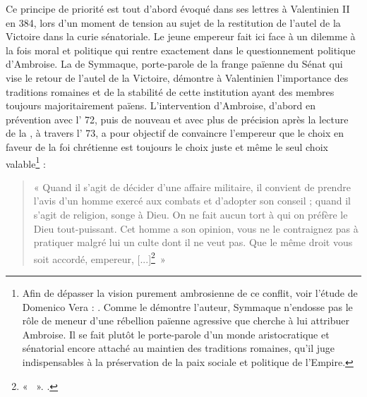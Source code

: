 Ce principe de priorité est tout d’abord évoqué dans ses lettres à Valentinien II en 384, lors d’un moment de tension au sujet de la restitution de l’autel de la Victoire dans la curie sénatoriale. Le jeune empereur fait ici face à un dilemme à la fois moral et politique qui rentre exactement dans le questionnement politique d’Ambroise. La  de Symmaque, porte-parole de la frange païenne du Sénat qui vise le retour de l'autel de la Victoire, démontre à Valentinien l'importance des traditions romaines et de la stabilité de cette institution ayant des membres toujours majoritairement païens. L’intervention d’Ambroise, d'abord en prévention avec l’ 72, puis de nouveau et avec plus de précision après la lecture de la , à travers l’ 73, a pour objectif de convaincre l’empereur que le choix en faveur de la foi chrétienne est toujours le choix juste et même le seul choix valable\footnote{Afin de dépasser la vision purement ambrosienne de ce conflit, voir l'étude de Domenico Vera : \cite{vera_commento_1981}. Comme le démontre l'auteur, Symmaque n'endosse pas le rôle de meneur d'une rébellion païenne agressive que cherche à lui attribuer Ambroise. Il se fait plutôt le porte-parole d'un monde aristocratique et sénatorial encore attaché au maintien des traditions romaines, qu'il juge indispensables à la préservation de la paix sociale et politique de l'Empire.} :

\bigskip

\begin{quote}
    « Quand il s’agit de décider d’une affaire militaire, il convient de prendre l’avis d’un homme exercé aux combats et d’adopter son conseil ; quand il s’agit de religion, songe à Dieu. On ne fait aucun tort à qui on préfère le Dieu tout-puissant. Cet homme a son opinion, vous ne le contraignez pas à pratiquer malgré lui un culte dont il ne veut pas. Que le même droit vous soit accordé, empereur, [...]\footnote{« ~». \cite[, 7]{ambroise_lettres}.}~»
\end{quote}

\bigskip

